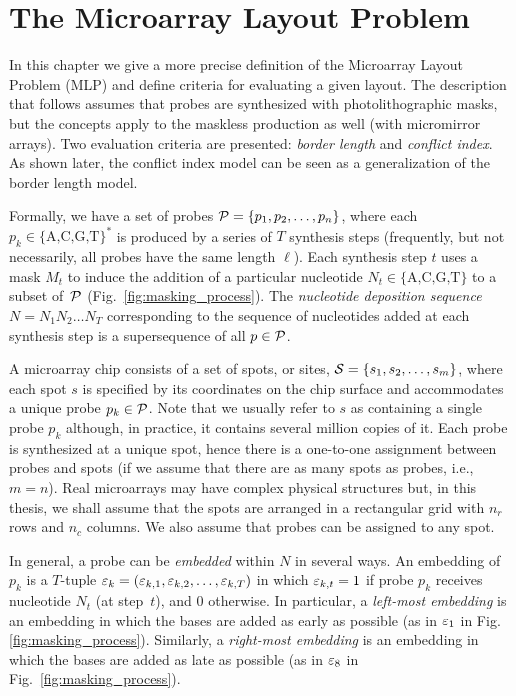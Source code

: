 \chapter{The Microarray Layout Problem}
\label{ch:mlp}

In this chapter we give a more precise definition of the Microarray Layout
Problem (MLP) and define criteria for evaluating a given layout. The description
that follows assumes that probes are synthesized with photolithographic masks,
but the concepts apply to the maskless production as well (with micromirror
arrays). Two evaluation criteria are presented: \emph{border length} and \emph{
conflict index}. As shown later, the conflict index model can be seen as a
generalization of the border length model.

Formally, we have a set of probes ${\mathcal{P}} = \{p_{1}, p_{2}, \dots, p_{n}\}$,
where each $p_k \in \{\text{A,C,G,T}\}^\ast$ is produced by a series of $T$
synthesis steps (frequently, but not necessarily, all probes have the same
length $\ell$). Each synthesis step $t$ uses a mask $M_t$ to induce the addition
of a particular nucleotide $N_t \in \{\text{A,C,G,T}\}$ to a subset of~${\mathcal{P}}$
(Fig.~\ref{fig:masking_process}). The \emph{nucleotide deposition sequence}
$N = N_{1} N_{2} \ldots N_{T}$ corresponding to the sequence of nucleotides
added at each synthesis step is a supersequence of all $p \in {\mathcal{P}}$.

A microarray chip consists of a set of spots, or sites,
${\mathcal{S}} = \{s_{1}, s_{2}, \dots, s_{m}\}$, where each spot $s$ is specified by
its coordinates on the chip surface and accommodates a unique probe
$p_k \in {\mathcal{P}}$. Note that we usually refer to $s$ as containing a single probe
$p_k$ although, in practice, it contains several million copies of it. Each
probe is synthesized at a unique spot, hence there is a one-to-one assignment
between probes and spots (if we assume that there are as many spots as probes,
i.e., $m=n$). Real microarrays may have complex physical structures but, in this
thesis, we shall assume that the spots are arranged in a rectangular grid with
$n_r$ rows and $n_c$ columns. We also assume that probes can be assigned to any
spot.

In general, a probe can be \emph{embedded} within $N$ in several ways. An
embedding of $p_{k}$ is a $T$-tuple
$\varepsilon_{k} = (\varepsilon_{k,1}, \varepsilon_{k,2}, \dots, \varepsilon_{k,T})$ in which
$\varepsilon_{k,t} = 1$ if probe $p_{k}$ receives nucleotide $N_{t}$ (at step~$t$), and
0 otherwise. In particular, a \emph{left-most embedding} is an embedding in
which the bases are added as early as possible (as in $\varepsilon_1$ in Fig.~
\ref{fig:masking_process}). Similarly, a \emph{right-most embedding} is an
embedding in which the bases are added as late as possible (as in $\varepsilon_8$ in
Fig.~\ref{fig:masking_process}).

